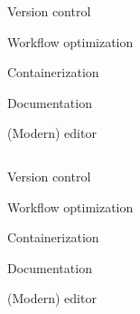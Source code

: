 \documentclass[usenames,dvipsnames]{beamer}
\theoremstyle{plain}
\theoremstyle{definition}
\begin{document}



\begin{frame}{\setframetitle{}}
  
  \begin{columns}[t]
    
    \begin{itemize}
      \item \textcolor{bg!85!normal text.fg}{Version control
      \item Workflow optimization}    
      \item Containerization  
      \textcolor{bg!85!normal text.fg}
      {\item Documentation
      \item (Modern) editor} 
    \end{itemize}
    
    \begin{figure}
      {}
    \end{figure}
  \end{columns}
  
\end{frame}





\begin{frame}{\setframetitle{}}
  
  \begin{columns}[t]
    
    \begin{itemize}
      \item \textcolor{bg!85!normal text.fg}{Version control
      \item Workflow optimization    
      \item Containerization }
      \item Documentation
      \textcolor{bg!85!normal text.fg}
      {\item (Modern) editor} 
    \end{itemize}
    
    \begin{figure}
      {}
    \end{figure}
  \end{columns}
  
\end{frame}
\end{document}
